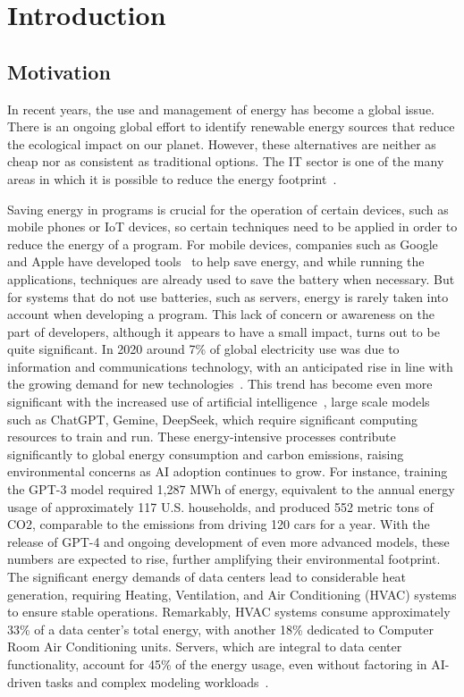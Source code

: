 


\chapter{Introduction}

\section{Motivation}

In recent years, the use and management of energy has become a global issue. There is an ongoing global effort to identify renewable energy sources that reduce the ecological impact on our planet. However, these alternatives are neither as cheap nor as consistent as traditional options. The IT sector is one of the many areas in which it is possible to reduce the energy footprint~\cite{annurev:/content/journals/10.1146/annurev.resource.102308.124234,10.1145/1666420.1666438}.

Saving energy in programs is crucial for the operation of certain devices, such as mobile phones or IoT devices, so certain techniques need to be applied in order to reduce the energy of a program. For mobile devices, companies such as Google and Apple have developed tools~\cite{google_adaptive_battery,google_battery_saver,apple_clean_energy, android_power_profiler} to help save energy, and while running the applications, techniques are already used to save the battery when necessary. But for systems that do not use batteries, such as servers, energy is rarely taken into account when developing a program. This lack of concern or awareness on the part of developers, although it appears to have a small impact, turns out to be quite significant. In 2020 around 7\% of global electricity use was due to information and communications technology, with an anticipated rise in line with the growing demand for new technologies~\cite{article}. This trend has become even more significant with the increased use of artificial intelligence~\cite{patterson2021carbon}, large scale models such as ChatGPT, Gemine, DeepSeek, which require significant computing resources to train and run. These energy-intensive processes contribute significantly to global energy consumption and carbon emissions, raising environmental concerns as AI adoption continues to grow. For instance, training the GPT-3 model required 1,287 MWh of energy, equivalent to the annual energy usage of approximately 117 U.S. households, and produced 552 metric tons of CO2, comparable to the emissions from driving 120 cars for a year. With the release of GPT-4 and ongoing development of even more advanced models, these numbers are expected to rise, further amplifying their environmental footprint. The significant energy demands of data centers lead to considerable heat generation, requiring Heating, Ventilation, and Air Conditioning (HVAC) systems to ensure stable operations. Remarkably, HVAC systems consume approximately 33\% of a data center's total energy, with another 18\% dedicated to Computer Room Air Conditioning units. Servers, which are integral to data center functionality, account for 45\% of the energy usage, even without factoring in AI-driven tasks and complex modeling workloads~\cite{balaras2017high}.

